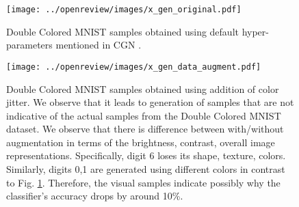 \begin{figure}[H]
    \centering
    \texttt{[image: ../openreview/images/x\_gen\_original.pdf]}
        \caption{Double Colored MNIST samples obtained using default hyper-parameters mentioned in CGN \cite{sauer2021counterfactual}.
        }
    \label{fig:original_grid}
\end{figure}

\begin{figure}[H]
    \centering 
    \texttt{[image: ../openreview/images/x\_gen\_data\_augment.pdf]}
        \caption{Double Colored MNIST samples obtained using addition of color jitter. We observe that it leads to generation of samples that are not indicative of the actual samples from the Double Colored MNIST dataset.  We observe that there is difference between with/without augmentation in terms of the brightness, contrast, overall image representations. Specifically, digit 6 loses its shape, texture, colors. Similarly, digits 0,1 are generated using different colors in contrast to Fig. \ref{fig:original_grid}. Therefore, the visual samples indicate possibly why the classifier's accuracy drops by around 10\%. 
        }
    \label{fig:data_augment_grid}
\end{figure}



